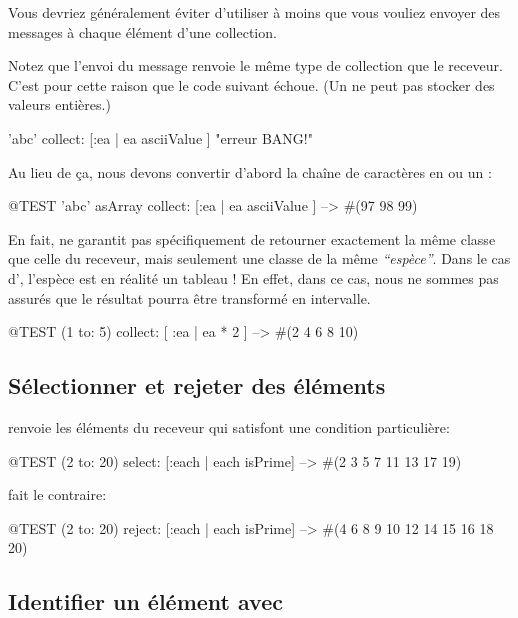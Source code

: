 \documentclass[a4paper,10pt,twoside]{book}
\begin{document}
Vous devriez généralement éviter d'utiliser  à moins que 
vous vouliez envoyer des messages à chaque élément d'une collection.

Notez que l'envoi du message  renvoie le même type de collection
que le receveur.
C'est pour cette raison que le code suivant échoue.
(Un  ne peut pas stocker des valeurs entières.)
\begin{code}{}
'abc' collect: [:ea | ea asciiValue ]      "erreur BANG!"
\end{code}
\noindent
Au lieu de ça, nous devons convertir d'abord la chaîne de caractères
en  ou un :
\begin{code}{@TEST}
'abc' asArray collect: [:ea | ea asciiValue ] --> #(97 98 99)
\end{code}

En fait,  ne garantit pas spécifiquement de retourner 
exactement la même classe que celle du receveur, mais seulement une classe
de la même \emph{``espèce''}.  Dans le cas d', l'espèce est en réalité un tableau !
En effet, dans ce cas, nous ne sommes pas assurés que le résultat pourra être transformé en intervalle.
\begin{code}{@TEST}
(1 to: 5) collect: [ :ea | ea * 2 ] --> #(2 4 6 8 10)
\end{code}

\subsection{Sélectionner et rejeter des éléments}

 renvoie les éléments du receveur qui satisfont
une condition particulière:

\begin{code}{@TEST}
(2 to: 20) select: [:each | each isPrime] --> #(2 3 5 7 11 13 17 19)
\end{code}

 fait le contraire:
\begin{code}{@TEST}
(2 to: 20) reject: [:each | each isPrime] --> #(4 6 8 9 10 12 14 15 16 18 20)
\end{code}

\subsection{Identifier un élément avec }
\end{document}
